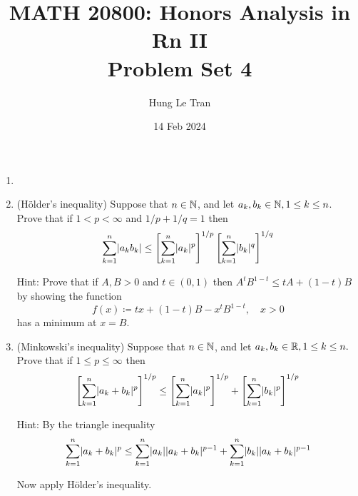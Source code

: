 \documentclass[a4paper, 10pt]{article}
\title{MATH 20800: Honors Analysis in Rn II \\ \large Problem Set 4}
\date{14 Feb 2024}
\author{Hung Le Tran}
\begin{document}
\maketitle
\setcounter{section}{4}
\begin{problem} [\done]
    \begin{enumerate}
        \item[]
        \item (H\"{o}lder's inequality) Suppose that $n \in \mathbb{N}$, and let $a_k, b_k \in \mathbb{N}, 1 \leq k \leq n$. Prove that if $1 < p < \infty$ and $1/p + 1/q = 1$ then \begin{equation*}
            \sum_{k=1}^{n} \lvert a_k b_k\rvert \leq \left[\sum_{k=1}^{n} \lvert a_k\rvert^p\right]^{1/p} \left[\sum_{k=1}^{n} \lvert b_k\rvert^q\right]^{1/q}
        \end{equation*}

        Hint: Prove that if $A, B > 0$ and $t \in (0, 1)$ then $A^t B^{1-t} \leq tA + (1-t) B$ by showing the function \begin{equation*}
        f(x) \coloneqq tx + (1-t)B - x^t B^{1-t}, \quad x > 0
        \end{equation*}
        has a minimum at $x = B$.

        \item (Minkowski's inequality) Suppose that $n \in \mathbb{N}$, and let $a_k, b_k \in \mathbb{R}, 1 \leq k \leq n.$ Prove that if $1 \leq p \leq \infty$ then \begin{equation*}
        \left[\sum_{k=1}^{n} \lvert a_k + b_k\rvert^{p}\right]^{1/p} \leq \left[\sum_{k=1}^{n} \lvert a_k\rvert^p\right]^{1/p} + \left[\sum_{k=1}^{n} \lvert b_k\rvert^p\right]^{1/p}
        \end{equation*}
        
        Hint: By the triangle inequality \begin{equation*}
        \sum_{k=1}^{n} \lvert a_k + b_k\rvert^p \leq \sum_{k=1}^{n} \lvert a_k\rvert \lvert a_k + b_k\rvert^{p-1} + \sum_{k=1}^{n} \lvert b_k\rvert \lvert a_k + b_k\rvert^{p-1}
        \end{equation*}

        Now apply H\"{o}lder's inequality.
    \end{enumerate}
\end{problem}
\end{document}
